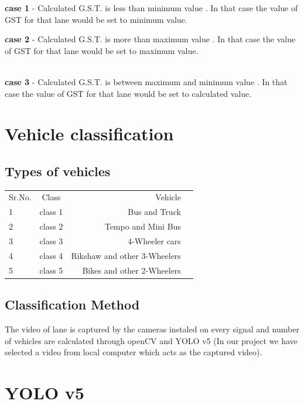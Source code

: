 \documentclass[12pt,a4paper]{report}
\begin{document}
\textbf{case 1} - Calculated G.S.T. is less than minimum value . In that case the value of GST for that lane would be set to minimum value.\\ \par

\textbf{case 2 }-  Calculated G.S.T. is more than maximum value . In that case the value of GST for that lane would be set to maximum value.\\\ \par

\textbf{case 3} - Calculated G.S.T. is between maximum and minimum value . In that case the value of GST for that lane would be set to calculated value.\\ \par



\newpage
\section {\textbf{\large Vehicle classification}}


\subsection{ Types of vehicles}
\begin{tabular}{||l|c|r|p{6cm}||}
    Sr.No. & Class & Vehicle  \\
    1 & class 1 & Bus and Truck \\
    2 & class 2 &Tempo and Mini Bus \\
    3 & class 3 & 4-Wheeler cars \\
    4 & class 4 & Rikshaw and other 3-Wheelers \\
    5 & class 5 & Bikes and other 2-Wheelers \\
\end{tabular}
\subsection{Classification Method }
The video of lane is captured by the cameras instaled on every signal and number of vehicles are calculated through openCV and YOLO v5
(In our project we have selected a video from local computer which acts as the captured video).            
\newpage
       
\section {\textbf{\large YOLO v5 }}
\end{document}
